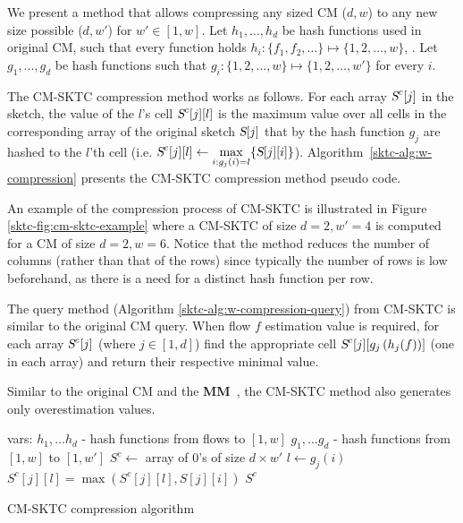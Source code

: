 We present a method that allows compressing any sized CM ($d,w$) to any new size possible ($d,w'$) for $w' \in [1,w]$. 
Let $h_1, \dots ,h_d$ be  hash functions used in original CM, such that every function holds $h_i : \{f_1,f_2, \dots\} \mapsto \{1,2, \dots, w\}$, . Let $g_1,...,g_d$ be  hash functions such that $g_i : \{1,2, \dots, w\} \mapsto \{1,2, \dots, w'\}$ for every $i$. 

The CM-SKTC compression method works as follows. For each array $\textsl{S}^c[j]$ in the sketch, the value of the $l$'s cell $\textsl{S}^c[j][l]$ is the maximum value over all cells in the corresponding array of the original sketch $\textsl{S}[j]$ that by the hash function $g_j$ are hashed to the $l$'th cell (i.e. $\textsl{S}^c[j][l] \gets \max\limits_{i: g_j(i) = l} \{ \textsl{S}[j][i]\}$). Algorithm~\ref{sktc-alg:w-compression} presents the CM-SKTC compression method pseudo code.

An example of the compression process of CM-SKTC is illustrated in Figure \ref{sktc-fig:cm-sktc-example} where a CM-SKTC of size  $d=2, w'=4$ is computed for a CM of size $d=2, w=6$. Notice that the method reduces the number of columns (rather than that of the rows) since typically the number of rows is low beforehand, as there is a need for a distinct hash function per row.

The query method (Algorithm \ref{sktc-alg:w-compression-query}) from CM-SKTC is similar to the original CM query. When flow $f$ estimation value is required, for each array $\textsl{S}^c[j]$ (where $j \in [1,d]$) find the appropriate cell  $\textsl{S}^c[j][g_j\left(h_j(f)\right)]$ (one in each array) and return their respective minimal value. 

Similar to the original CM and the \textbf{MM}~\cite{yang2018elastic},  the CM-SKTC method also generates only overestimation values. 

\begin{algorithm}[h]
    \small
    \begin{algorithmic}[1]
    \Statex vars:
    \Statex $h_1,\dots h_d$ - hash functions from flows to $[1,w]$
    \Statex $g_1, \dots g_d$ - hash functions from $[1,w]$ to $[1,w']$
        \State $S^c \gets $ array of $0$'s of size $d \times w'$
        \State $l \gets g_j(i)$
        \State  $S^c[j][l] = \max(S^c[j][l], S[j][i])$
      \EndFor
      \EndFor
      \State \Return $S^c$
        \EndProcedure

    \end{algorithmic}
    \caption{CM-SKTC compression algorithm}
    \label{sktc-alg:w-compression}
\end{algorithm}

